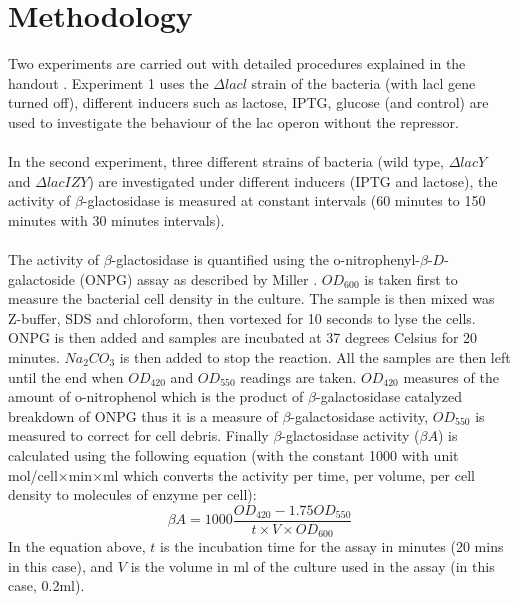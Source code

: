 \documentclass{article}
\begin{document}
\section{Methodology}
Two experiments are carried out with detailed procedures explained in the handout \cite{goossens93}. Experiment 1 uses the $\Delta lacl$ strain of the bacteria (with lacl gene turned off), different inducers such as lactose, IPTG, glucose (and control) are used to investigate the behaviour of the lac operon without the repressor. \\ \\
In the second experiment, three different strains of bacteria (wild type, $\Delta lacY$ and $\Delta lacIZY$) are investigated under different inducers (IPTG and lactose), the activity of $\beta$-glactosidase is measured at constant intervals (60 minutes to 150 minutes with 30 minutes intervals). \\ \\
The activity of $\beta$-glactosidase is quantified using the o-nitrophenyl-$\beta$-$D$-galactoside (ONPG) assay as described by Miller \cite{miller}. $OD_{600}$ is taken first to measure the bacterial cell density in the culture. The sample is then mixed was Z-buffer, SDS and chloroform, then vortexed for 10 seconds to lyse the cells. ONPG is then added and samples are incubated at 37 degrees Celsius for 20 minutes. $Na_2CO_3$ is then added to stop the reaction. All the samples are then left until the end when $OD_{420}$ and $OD_{550}$ readings are taken. $OD_{420}$ measures of the amount of o-nitrophenol which is the product of $\beta$-galactosidase catalyzed breakdown of ONPG thus it is a measure of $\beta$-galactosidase activity, $OD_{550}$ is measured to correct for cell debris. Finally $\beta$-glactosidase activity ($\beta A$) is calculated using the following equation (with the constant 1000 with unit mol/cell$\times$min$\times$ml which converts the activity per time, per volume, per cell density to molecules of enzyme per cell):
$$
\beta A = 1000 \dfrac{OD_{420}-1.75OD_{550}}{t\times V\times OD_{600}}
$$
In the equation above, $t$ is the incubation time for the assay in minutes (20 mins in this case), and $V$ is the volume in ml of the culture used in the assay (in this case, 0.2ml).
\end{document}
